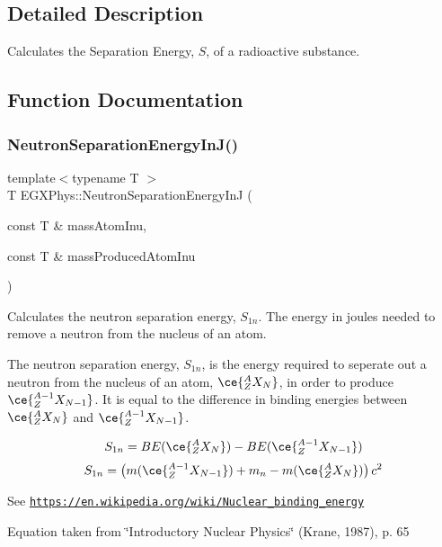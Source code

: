 \subsection{Detailed Description}
Calculates the Separation Energy, $S$, of a radioactive substance. 

\subsection{Function Documentation}
\mbox{\label{group___nuclear_separation_energy_ga14a4bb972ae000ef4ff35f2734ff22d0}} 
\subsubsection{\texorpdfstring{Neutron\+Separation\+Energy\+In\+J()}{NeutronSeparationEnergyInJ()}}
{\footnotesize\ttfamily template$<$typename T $>$ \\
T E\+G\+X\+Phys\+::\+Neutron\+Separation\+Energy\+InJ (\begin{DoxyParamCaption}\item[{const T \&}]{mass\+Atom\+Inu,  }\item[{const T \&}]{mass\+Produced\+Atom\+Inu }\end{DoxyParamCaption})}



Calculates the neutron separation energy, $S_{1n}$. The energy in joules needed to remove a neutron from the nucleus of an atom. 

The neutron separation energy, $S_{1n}$, is the energy required to seperate out a neutron from the nucleus of an atom, $\ce{ ^{A}_{Z}X_{N} }$, in order to produce $\ce{ ^{A-1}_{Z}X_{N-1} }$. It is equal to the difference in binding energies between $\ce{ ^{A}_{Z}X_{N} }$ and $\ce{ ^{A-1}_{Z}X_{N-1} }$.

\[S_{1n} = BE(\ce{ ^{A}_{Z}X_{N} }) - BE(\ce{ ^{A-1}_{Z}X_{N-1} })\] \[S_{1n} = \left ( m(\ce{ ^{A-1}_{Z}X_{N-1} }) + m_n - m(\ce{ ^{A}_{Z}X_{N} }) \right ) c^2\]

See \href{https://en.wikipedia.org/wiki/Nuclear_binding_energy}{\tt https\+://en.\+wikipedia.\+org/wiki/\+Nuclear\+\_\+binding\+\_\+energy}

Equation taken from \char`\"{}\+Introductory Nuclear Physics\char`\"{} (Krane, 1987), p. 65


